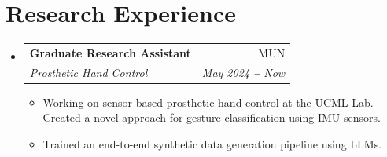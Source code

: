 \documentclass[letterpaper,12pt]{article}
\makeatletter
\newcommand{\resumeItem}[1]{
  \item\small{
    {#1 \vspace{-2pt}}
  }
}
\newcommand{\resumeSubheading}[4]{
  \vspace{-2pt}\item
    \begin{tabular*}{0.97\textwidth}[t]{l@{\extracolsep{\fill}}r}
      \textbf{#1} & #2 \\
      \textit{\small#3} & \textit{\small #4} \\
    \end{tabular*}\vspace{-7pt}
}
\newcommand{\resumeOrganizationHeading}[4]{
  \vspace{-2pt}\item
    \begin{tabular*}{0.97\textwidth}[t]{l@{\extracolsep{\fill}}r}
      \textbf{#1} & \textit{\small #2} \\
      \textit{\small#3}
    \end{tabular*}\vspace{-3pt}
}
\newcommand{\resumeSubHeadingListStart}{\begin{itemize}[leftmargin=0.15in, label={}]}
\newcommand{\resumeSubHeadingListEnd}{\end{itemize}}
\newcommand{\resumeItemListStart}{\begin{itemize}}
\newcommand{\resumeItemListEnd}{\end{itemize}\vspace{-5pt}}
\makeatother
\begin{document}
    




    
    




   




\section{Research Experience}
  \vspace{3pt}
  \resumeSubHeadingListStart
         \resumeSubheading
      {Graduate Research Assistant}{MUN}
      {Prosthetic Hand Control}{May 2024 \textbf{--} Now}
        \resumeItemListStart
            \resumeItem{Working on sensor-based prosthetic-hand control at the UCML Lab. Created a novel approach for gesture classification using IMU sensors. 
            }
            \resumeItem{Trained an end-to-end synthetic data generation pipeline using LLMs.
            }
           
      \resumeItemListEnd
\resumeSubHeadingListEnd
\end{document}
